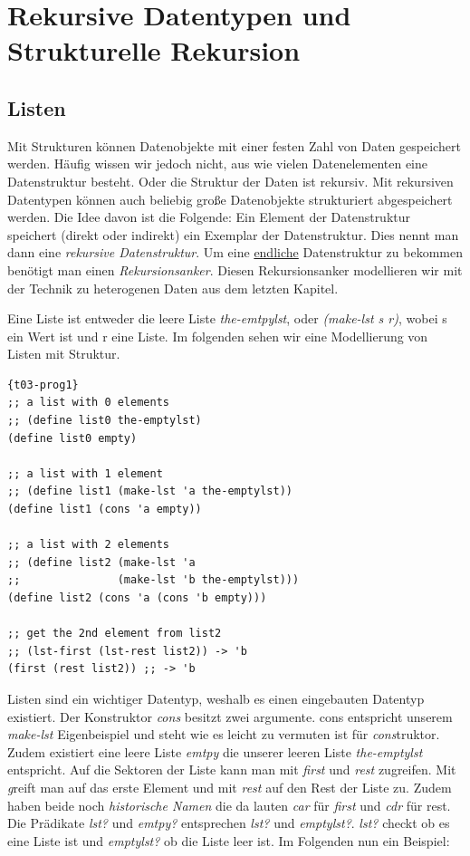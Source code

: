 \chapter{Rekursive Datentypen und Strukturelle Rekursion}
\section{Listen}
Mit Strukturen können Datenobjekte mit einer festen Zahl von Daten gespeichert werden. Häufig wissen wir jedoch nicht, aus wie vielen Datenelementen eine Datenstruktur besteht.
Oder die Struktur der Daten ist rekursiv.
Mit rekursiven Datentypen können auch beliebig große Datenobjekte strukturiert abgespeichert werden. Die Idee davon ist die Folgende: Ein Element der Datenstruktur speichert (direkt oder indirekt) ein Exemplar der Datenstruktur. Dies nennt man dann eine \textit{rekursive Datenstruktur}. Um eine \uline{endliche} Datenstruktur zu bekommen benötigt man einen \textit{Rekursionsanker}. Diesen Rekursionsanker modellieren wir mit der Technik zu heterogenen Daten aus dem letzten Kapitel.

Eine Liste ist entweder die leere Liste \textit{the-emtpylst}, oder \textit{(make-lst s r)}, wobei s ein Wert ist und r eine Liste. Im folgenden sehen wir eine Modellierung von Listen mit Struktur.

\begin{lstlisting}{t03-prog1}
;; a list with 0 elements
;; (define list0 the-emptylst)
(define list0 empty)

;; a list with 1 element
;; (define list1 (make-lst 'a the-emptylst))
(define list1 (cons 'a empty))

;; a list with 2 elements
;; (define list2 (make-lst 'a
;;               (make-lst 'b the-emptylst)))
(define list2 (cons 'a (cons 'b empty)))

;; get the 2nd element from list2
;; (lst-first (lst-rest list2)) -> 'b
(first (rest list2)) ;; -> 'b
\end{lstlisting}

Listen sind ein wichtiger Datentyp, weshalb es einen eingebauten Datentyp existiert. Der Konstruktor \textit{cons} besitzt zwei argumente. cons entspricht unserem \textit{make-lst} Eigenbeispiel und steht wie es leicht zu vermuten ist für \textit{cons}truktor. Zudem existiert eine leere Liste \textit{emtpy} die unserer leeren Liste \textit{the-emptylst} entspricht. Auf die Sektoren der Liste kann man mit \textit{first} und \textit{rest} zugreifen. Mit \textit greift man auf das erste Element und mit \textit{rest} auf den Rest der Liste zu. Zudem haben beide noch \textit{historische Namen} die da lauten \textit{car} für \textit{first} und \textit{cdr} für rest. Die Prädikate \textit{lst?} und \textit{emtpy?} entsprechen \textit{lst?} und \textit{emptylst?}.
\textit{lst?} checkt ob es eine Liste ist und \textit{emptylst?} ob die Liste leer ist. Im Folgenden nun ein Beispiel:


